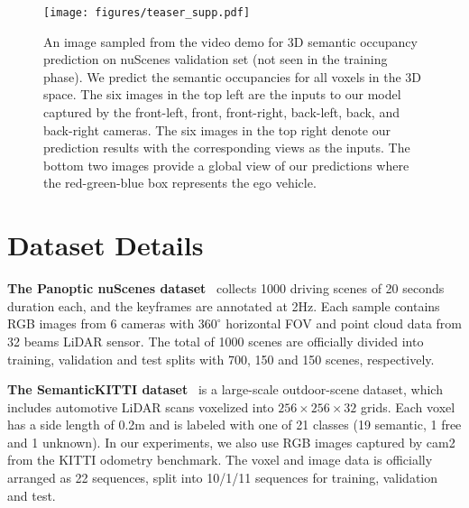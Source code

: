 \documentclass[10pt,twocolumn,letterpaper]{article}
\begin{document}
\appendix



\begin{figure*}[t]
\centering
\texttt{[image: figures/teaser\_supp.pdf]}
\vspace{-7mm}
\caption{An image sampled from the video demo for 3D semantic occupancy prediction on nuScenes validation set (not seen in the training phase). 
    We predict the semantic occupancies for all voxels in the 3D space.
    The six images in the top left are the inputs to our model captured by the front-left, front, front-right, back-left, back, and back-right cameras. 
    The six images in the top right denote our prediction results with the corresponding views as the inputs.
    The bottom two images provide a global view of our predictions where the red-green-blue box represents the ego vehicle.
}
\label{teaser_supp}
\vspace{-5mm}
\end{figure*}





\appendix


\section{Dataset Details} \label{dataset}

\textbf{The Panoptic nuScenes dataset}~\cite{fong2021panoptic} collects 1000 driving scenes of 20 seconds duration each, and the keyframes are annotated at 2Hz.
Each sample contains RGB images from 6 cameras with $360^{\circ}$ horizontal FOV and point cloud data from 32 beams LiDAR sensor.
The total of 1000 scenes are officially divided into training, validation and test splits with 700, 150 and 150 scenes, respectively.

\textbf{The SemanticKITTI dataset}~\cite{semantickitti} is a large-scale outdoor-scene dataset, which includes automotive LiDAR scans voxelized into $256\times 256\times 32$ grids.
Each voxel has a side length of 0.2m and is labeled with one of 21 classes (19 semantic, 1 free and 1 unknown).
In our experiments, we also use RGB images captured by cam2 from the KITTI odometry benchmark.
The voxel and image data is officially arranged as 22 sequences, split into 10/1/11 sequences for training, validation and test. 
\end{document}
